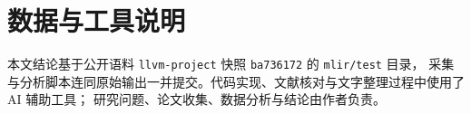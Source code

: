 \documentclass[acmsmall, screen=true, nonacm=true]{acmart}
\begin{document}

\maketitle










\section*{数据与工具说明}
本文结论基于公开语料 \texttt{llvm-project} 快照 \texttt{ba736172} 的 \texttt{mlir/test} 目录，
采集与分析脚本连同原始输出一并提交。代码实现、文献核对与文字整理过程中使用了 AI 辅助工具；
研究问题、论文收集、数据分析与结论由作者负责。



\end{document}
